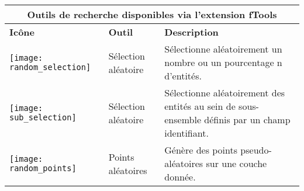 \begin{table}[ht]
\centering
 \begin{tabular}{|m{1cm}|m{3cm}|m{9cm}|}
 \hline \multicolumn{3}{|c|}{\textbf{Outils de recherche disponibles via l'extension fTools}} \\ 
 \hline \textbf{Icône} & \textbf{Outil} & \textbf{Description} \\
 \hline \texttt{[image: random\_selection]} & Sélection aléatoire & Sélectionne aléatoirement un nombre ou un pourcentage n d'entités. \\
 \hline \texttt{[image: sub\_selection]} & Sélection aléatoire  & Sélectionne aléatoirement des entités au sein de sous-ensemble définis par un champ identifiant. \\
 \hline \texttt{[image: random\_points]} & Points aléatoires & Génère des points pseudo-aléatoires sur une couche donnée. \\

\end{tabular}
\end{table}
